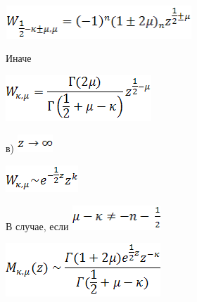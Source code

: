 \documentclass{article}
\begin{document}
\vspace{10pt}
\includegraphics[width=199pt, height=35pt, keepaspectratio=true]{3-fig005.png}

\vspace{28pt}
{\large{}Иначе}

\vspace{10pt}
\includegraphics[width=155pt, height=49pt, keepaspectratio=true]{3-fig006.png}

\vspace{28pt}
{\large{}в) }
\includegraphics[width=38pt, height=19pt, keepaspectratio=true]{3-fig007.png}

\vspace{10pt}
\includegraphics[width=77pt, height=29pt, keepaspectratio=true]{3-fig008.png}

\vspace{28pt}
{\large{}В случае, если }
\includegraphics[width=95pt, height=26pt, keepaspectratio=true]{3-fig009.png}

\vspace{10pt}
\includegraphics[width=165pt, height=57pt, keepaspectratio=true]{3-fig010.png}
\end{document}

